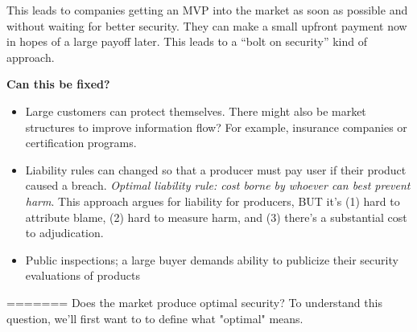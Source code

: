 This leads to companies getting an MVP into the market as soon as possible and without waiting for better security. They can make a small upfront payment now in hopes of a large payoff later. This leads to a ``bolt on security'' kind of approach. 

\textbf{Can this be fixed?}
\begin{itemize}
	\item Large customers can protect themselves. There might also be market structures to improve information flow? For example, insurance companies or certification programs.
	\item Liability rules can changed so that a producer must pay user if their product caused a breach. \textit{Optimal liability rule: cost borne by whoever can best prevent harm}. This approach argues for liability for producers, BUT it's (1) hard to attribute blame, (2) hard to measure harm, and (3) there's a substantial cost to adjudication.
	\item Public inspections; a large buyer demands ability to publicize their security evaluations of products 
\end{itemize}

=======
Does the market produce optimal security? To understand this question, we'll first want to to define what "optimal" means. 


